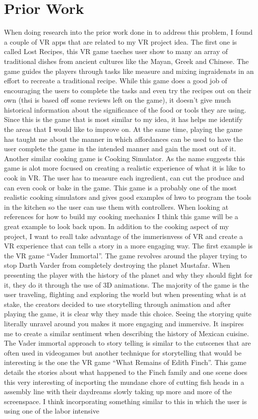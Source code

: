 \documentclass[12pt,twocolumn]{article}
\begin{document}
\section{Prior Work}
When doing research into the prior work done in to address this problem, I found a couple of VR apps that are related to my VR project idea. The first one is called Lost Recipes, this VR game taeches user show to many an array of traditional dishes from ancient cultures like the Mayan, Greek and Chinese. The game guides the players through tasks like measure and mixing ingraidenats in an effort to recreate a traditional recipe. While this game does a good job of encouraging the users to complete the tasks and even try the recipes out on their own (thsi is based off some reviews left on the game), it doesn’t give much historical information about the significance of the food or tools they are using. Since this is the game that is most similar to my idea, it has helps me identify the areas that I would like to improve on. At the same time, playing the game has taught me about the manner in which affordances can be used to have the user complete the game in the intended manner and gain the most out of it. Another similar cooking game is Cooking Simulator. As the name suggests this game is alot more focused on creating a realistic experience of what it is like to cook in VR. The user has to measure each ingredient, can cut the produce and can even cook or bake in the game. This game is a probably one of the most realistic cooking simulators and gives good examples of hwo to program the tools in the kitchen so the user can use them with controllers. When looking at references for how to build my cooking mechanics I think this game will be a great example to look back upon. In addition to the cooking aspect of my project, I want to reall take advantage of the immerisnvess of VR and create a VR experience that can tells a story in a more engaging way. The first example is the VR game “Vader Immortal”. The game revolves around the player trying to stop Darth Varder from completely destroying the planet Mustafar. When presenting the player with the history of the planet and why they should fight for it, they do it through the use of 3D animations. The majority of the game is the user traveling, flighting and exploring the world but when presenting what is at stake, the creators decided to use storytelling through animation and after playing the game, it is clear why they made this choice. Seeing the storying quite literally unravel around you makes it more engaging and immersive. It inspires me to create a similar sentiment when describing the history of Mexican cuisine. The Vader immortal approach to story telling is similar to the cutscenes that are often used in videogames but another technique for storytelling that would be interesting is the one the VR game “What Remains of Edith Finch”. This game details the stories about what happened to the Finch family and one scene does this very interesting of incporting the mundane chore of cutting fish heads in a assembly line with their daydreams slowly taking up more and more of the screenspace. I think incorporating something similar to this in which the user is using one of the labor intensive 
\end{document}
